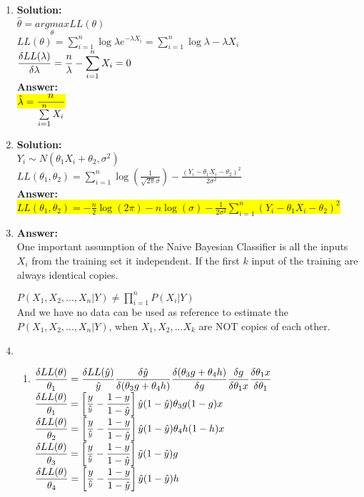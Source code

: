 \documentclass{article}
\newcommand{\myansw}{\textbf{Answer:}\\}
\newcommand{\mysolu}{\textbf{Solution:}\\}
\begin{document}
\thispagestyle{fancy} %

\begin{enumerate}
	\item

	\mysolu
	$\hat{\theta} = \underset{\theta}{argmax}LL(\theta)$\\
	$LL(\theta) = \sum\limits_{i = 1}^{n} \log\lambda e^{-\lambda X_i}=\sum\limits_{i = 1}^{n} \log\lambda -\lambda X_i$\\
	$\mathlarger{\frac{\delta LL(\lambda)}{\delta \lambda} = \frac{n}{\lambda}-\sum\limits_{i = 1}^{n}X_i} = 0$\\
	\myansw
	\colorbox{yellow}{$\mathlarger{\hat{\lambda} = \frac{n}{\sum\limits_{i = 1}^{n}X_i}}$}\\
	\item
	\mysolu
	$Y_i \sim N(\theta_1 X_i + \theta_2, \sigma^2)$\\
	$LL(\theta_1, \theta_2) = \sum\limits_{i = 1}^{n} \log(\frac{1}{\sqrt{2\pi} \sigma}) - \frac{(Y_i - \theta_1 X_i - \theta_2)^2}{2 \sigma^2}$\\
	\myansw
	\colorbox{yellow}{$LL(\theta_1, \theta_2) = -\frac{n}{2} \log(2\pi ) - n\log(\sigma) - \frac{1}{2 \sigma^2}\sum\limits_{i = 1}^{n}(Y_i - \theta_1 X_i - \theta_2)^2$}\\
	\item
	\myansw
	One important assumption of the Naive Bayesian Classifier is all the inputs $X_i$ from the training set it independent. If the first $k$ input of the training are always identical copies.
	
	$P(X_1, X_2,...,X_n|Y)\neq \prod\limits_{i = 1}^{n}P(X_i|Y)$\\
	And we have no data can be used as reference to estimate the $P(X_1, X_2,...,X_n|Y)$, when $X_1, X_2,...X_k$ are NOT copies of each other.
	\item
	\begin{enumerate}
		\item
		$\mathlarger{\frac{\delta LL(\theta)}{\theta_1}
			=\frac{\delta LL(\hat{y})}{\hat{y}}
			 \frac{\delta \hat{y}}{\delta(\theta_3 g + \theta_4 h)}
			 \frac{\delta(\theta_3 g + \theta_4 h)}{\delta g}
			 \frac{\delta g}{\delta\theta_1 x}
			 \frac{\delta \theta_1 x}{\delta \theta_1}
		 }$\\
	 	$\mathlarger{\frac{\delta LL(\theta)}{\theta_1}
	 		=\left[\frac{y}{\hat{^y}}-\frac{1-y}{1-\hat{y}}\right]
	 		\hat{y}(1-\hat{y})
	 		\theta_3
	 		g(1-g)
	 		x
 		}$\\
	 	$\mathlarger{\frac{\delta LL(\theta)}{\theta_2}
			=\left[\frac{y}{\hat{^y}}-\frac{1-y}{1-\hat{y}}\right]
			\hat{y}(1-\hat{y})
			\theta_4
			h(1-h)
			x
		}$\\ 	
	 	$\mathlarger{\frac{\delta LL(\theta)}{\theta_3}
			=\left[\frac{y}{\hat{^y}}-\frac{1-y}{1-\hat{y}}\right]
			\hat{y}(1-\hat{y})
			g
		}$\\
		$\mathlarger{\frac{\delta LL(\theta)}{\theta_4}
			=\left[\frac{y}{\hat{^y}}-\frac{1-y}{1-\hat{y}}\right]
			\hat{y}(1-\hat{y})
			h
		}$\\ 
	\end{enumerate}
	
	
	
\end{enumerate}


\newpage
\end{document}
